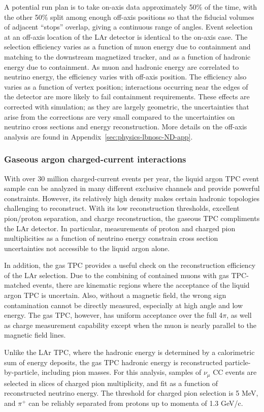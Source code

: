 A potential run plan is to take on-axis data approximately 50\% of the time, with the other 50\% split among enough off-axis positions so that the fiducial volumes of adjacent ``stops'' overlap, giving a continuous range of angles. Event selection at an off-axis location of the LAr detector is identical to the on-axis case. The selection efficiency varies as a function of muon energy due to containment and matching to the downstream magnetized tracker, and as a function of hadronic energy due to containment. As muon and hadronic energy are correlated to neutrino energy, the efficiency varies with off-axis position. The efficiency also varies as a function of vertex position; interactions occurring near the edges of the detector are more likely to fail containment requirements. These effects are corrected with simulation; as they are largely geometric, the uncertainties that arise from the corrections are very small compared to the uncertainties on neutrino cross sections and energy reconstruction. More details on the off-axis analysis are found in Appendix~\ref{sec:physics-lbnosc-ND-app}.

\subsubsection{Gaseous argon charged-current interactions}

With over 30 million charged-current events per year, the liquid argon TPC event sample can be analyzed in many different exclusive channels and provide powerful constraints. However, its relatively high density makes certain hadronic topologies challenging to reconstruct. With its low reconstruction thresholds, excellent pion/proton separation, and charge reconstruction, the gaseous TPC compliments the LAr detector. In particular, measurements of proton and charged pion multiplicities as a function of neutrino energy constrain cross section uncertainties not accessible to the liquid argon alone.

In addition, the gas TPC provides a useful check on the reconstruction efficiency of the LAr selection. Due to the combining of contained muons with gas TPC-matched events, there are kinematic regions where the acceptance of the liquid argon TPC is uncertain. Also, without a magnetic field, the wrong sign contamination cannot be directly measured, especially at high angle and low energy. The gas TPC, however, has uniform acceptance over the full 4$\pi$, as well as charge measurement capability except when the muon is nearly parallel to the magnetic field lines.

Unlike the LAr TPC, where the hadronic energy is determined by a calorimetric sum of energy deposits, the gas TPC hadronic energy is reconstructed particle-by-particle, including pion masses. For this analysis, samples of $\nu_{\mu}$ CC events are selected in slices of charged pion multiplicity, and fit as a function of reconstructed neutrino energy. The threshold for charged pion selection is 5 MeV, and $\pi^{+}$ can be reliably separated from protons up to momenta of 1.3 GeV/c.

